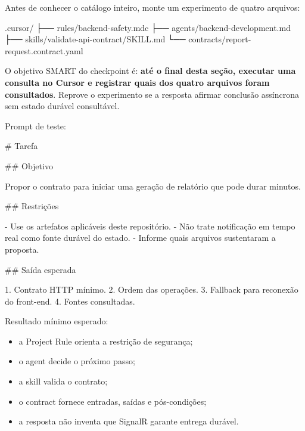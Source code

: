 \documentclass[
  10pt,
  a4paper,
  oneside]{book}
\newenvironment{Shaded}{}{}
\newcommand{\FunctionTok}[1]{\textcolor[rgb]{0.02,0.16,0.49}{#1}}
\newcommand{\NormalTok}[1]{#1}
\newcommand{\SpecialStringTok}[1]{\textcolor[rgb]{0.73,0.40,0.53}{#1}}
\providecommand{\tightlist}{%
  \setlength{\itemsep}{0pt}\setlength{\parskip}{0pt}}
\begin{document}
Antes de conhecer o catálogo inteiro, monte um experimento de quatro
arquivos:

\begin{Shaded}
\begin{Highlighting}[]
\NormalTok{.cursor/}
\NormalTok{├── rules/backend{-}safety.mdc}
\NormalTok{├── agents/backend{-}development.md}
\NormalTok{├── skills/validate{-}api{-}contract/SKILL.md}
\NormalTok{└── contracts/report{-}request.contract.yaml}
\end{Highlighting}
\end{Shaded}

O objetivo SMART do checkpoint é: \textbf{até o final desta seção,
executar uma consulta no Cursor e registrar quais dos quatro arquivos
foram consultados}. Reprove o experimento se a resposta afirmar
conclusão assíncrona sem estado durável consultável.

Prompt de teste:

\begin{Shaded}
\begin{Highlighting}[]
\FunctionTok{\# Tarefa}

\FunctionTok{\#\# Objetivo}

\NormalTok{Propor o contrato para iniciar uma geração de relatório que pode durar minutos.}

\FunctionTok{\#\# Restrições}

\SpecialStringTok{{-} }\NormalTok{Use os artefatos aplicáveis deste repositório.}
\SpecialStringTok{{-} }\NormalTok{Não trate notificação em tempo real como fonte durável do estado.}
\SpecialStringTok{{-} }\NormalTok{Informe quais arquivos sustentaram a proposta.}

\FunctionTok{\#\# Saída esperada}

\SpecialStringTok{1. }\NormalTok{Contrato HTTP mínimo.}
\SpecialStringTok{2. }\NormalTok{Ordem das operações.}
\SpecialStringTok{3. }\NormalTok{Fallback para reconexão do front{-}end.}
\SpecialStringTok{4. }\NormalTok{Fontes consultadas.}
\end{Highlighting}
\end{Shaded}

Resultado mínimo esperado:

\begin{itemize}
\tightlist
\item
  a Project Rule orienta a restrição de segurança;
\item
  o agent decide o próximo passo;
\item
  a skill valida o contrato;
\item
  o contract fornece entradas, saídas e pós-condições;
\item
  a resposta não inventa que SignalR garante entrega durável.
\end{itemize}
\end{document}
